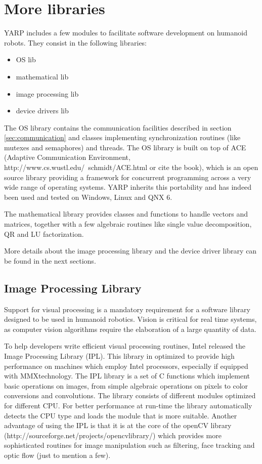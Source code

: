 \section{More libraries}
YARP includes a few modules to facilitate software development on humanoid robots. They consist in the following libraries:
\begin{itemize}
\item{OS lib}
\item{mathematical lib}
\item{image processing lib}
\item{device drivers lib}
\end{itemize}

The OS library contains the communication facilities described in section \ref{sec:communication} and classes implementing synchronization routines (like mutexes and semaphores) and threads. The OS library is built on top of ACE (Adaptive Communication Environment, http://www.cs.wustl.edu/~schmidt/ACE.html or cite the book), which is an open source library providing a framework for concurrent programming across a very wide range of operating systems. YARP inherits this portability and has indeed been used and tested on Windows, Linux and QNX 6.

The mathematical library provides classes and functions to handle vectors and matrices, together with a few algebraic routines like single value decomposition, QR and LU factorization.

More details about the image processing library and the device driver library can be found in the next sections.

\subsection{Image Processing Library}
Support for visual processing is a mandatory requirement for a software library designed to be used in humanoid robotics. Vision is critical for real time systems, as computer vision algorithms require the elaboration of a large quantity of data.

To help developers write efficient visual processing routines, Intel released the Image Processing Library (IPL). This library in optimized to provide high performance on machines which employ Intel processors, especially if equipped with MMX\texttrademark technology. The IPL library is a set of C functions which implement basic operations on images, from simple algebraic operations on pixels to color conversions and convolutions. The library consists of different modules optimized for different CPU. For better performance at run-time the library automatically detects the CPU type and loads the module that is more suitable. Another advantage of using the IPL is that it is at the core of the openCV library (http://sourceforge.net/projects/opencvlibrary/) which provides more sophisticated routines for image manipulation such as filtering, face tracking and optic flow (just to mention a few).

